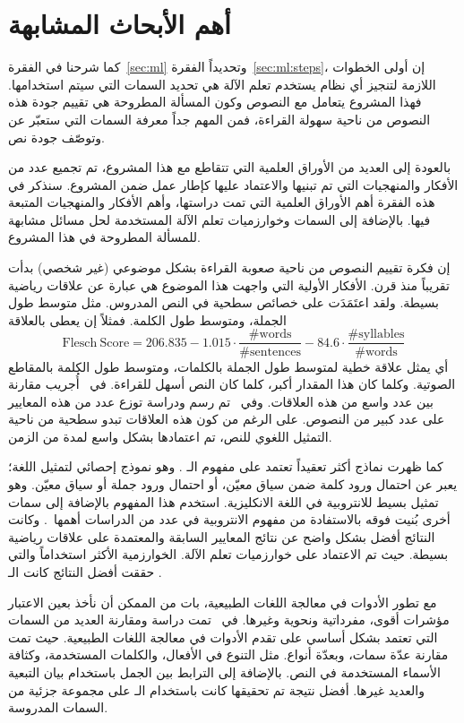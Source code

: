 \section{أهم الأبحاث المشابهة}
كما شرحنا في الفقرة~\ref{sec:ml} وتحديداً الفقرة~\ref{sec:ml:steps}، إن أولى الخطوات اللازمة لتنجيز أي نظام يستخدم تعلم الآلة
هي تحديد السمات التي سيتم استخدامها.
فهذا المشروع يتعامل مع النصوص وكون المسألة المطروحة هي تقييم جودة هذه النصوص من ناحية سهولة القراءة،
فمن المهم جداً معرفة السمات التي ستعبّر عن وتوصّف جودة نص.

بالعودة إلى العديد من الأوراق العلمية التي تتقاطع مع هذا المشروع،
تم تجميع عدد من الأفكار والمنهجيات التي تم تبنيها والاعتماد عليها كإطار عمل ضمن المشروع.
سنذكر في هذه الفقرة أهم الأوراق العلمية التي تمت دراستها،
وأهم الأفكار والمنهجيات المتبعة فيها.
بالإضافة إلى السمات وخوارزميات تعلم الآلة المستخدمة لحل مسائل مشابهة للمسألة المطروحة في هذا المشروع.

إن فكرة تقييم النصوص من ناحية صعوبة القراءة بشكل موضوعي (غير شخصي) بدأت تقريباً منذ قرن.
الأفكار الأولية التي واجهت هذا الموضوع هي عبارة عن علاقات رياضية بسيطة.
ولقد اعتَمَدَت على خصائص سطحية في النص المدروس.
مثل متوسط طول الجملة، ومتوسط طول الكلمة.
فمثلاً إن  يعطى بالعلاقة
$$ \mathrm{Flesch\ Score} = 206.835 -
1.015 \cdot \frac{\mathrm{\# words}}{\mathrm{\# sentences}}
- 84.6 \cdot \frac{\mathrm{\# syllables}}{\mathrm{\# words}} $$
أي يمثل علاقة خطية لمتوسط طول الجملة بالكلمات، ومتوسط طول الكلمة بالمقاطع الصوتية.
وكلما كان هذا المقدار أكبر، كلما كان النص أسهل للقراءة.
في~\cite{dubay2007} أُجريب مقارنة بين عدد واسع من هذه العلاقات.
وفي~\cite{readability-scores-gutenberg} تم رسم ودراسة توزع عدد من هذه المعايير على عدد كبير من النصوص.
على الرغم من كون هذه العلاقات تبدو سطحية من ناحية التمثيل اللغوي للنص،
تم اعتمادها بشكل واسع لمدة من الزمن.

كما ظهرت نماذج أكثر تعقيداً تعتمد على مفهوم الـ .
وهو نموذج إحصائي لتمثيل اللغة؛ يعبر عن احتمال ورود كلمة ضمن سياق معيّن، أو احتمال ورود جملة أو سياق معيّن.
وهو تمثيل بسيط للانتروبية في اللغة الانكليزية.
استخدم هذا المفهوم بالإضافة إلى سمات أخرى بُنيت فوقه بالاستفادة من مفهوم الانتروبية في عدد من الدراسات
أهمها~\cite{schwarm2005, petersen2009}.
وكانت النتائج أفضل بشكل واضح عن نتائج المعايير السابقة والمعتمدة على علاقات رياضية بسيطة.
حيث تم الاعتماد على خوارزميات تعلم الآلة.
الخوارزمية الأكثر استخداماً والتي حققت أفضل النتائج كانت الـ .

مع تطور الأدوات في معالجة اللغات الطبيعية، بات من الممكن أن نأخذ بعين الاعتبار مؤشرات أقوى، مفرداتية ونحوية وغيرها.
في~\cite{feng-phd, feng2010comparison} تمت دراسة ومقارنة العديد من السمات
التي تعتمد بشكل أساسي على تقدم الأدوات في معالجة اللغات الطبيعية.
حيث تمت مقارنة عدّة سمات، وبعدّة أنواع.
مثل التنوع في الأفعال، والكلمات المستخدمة، وكثافة الأسماء المستخدمة في النص.
بالإضافة إلى الترابط بين الجمل باستخدام بيان التبعية والعديد غيرها.
أفضل نتيجة تم تحقيقها كانت باستخدام الـ  على مجموعة جزئية من السمات المدروسة.

